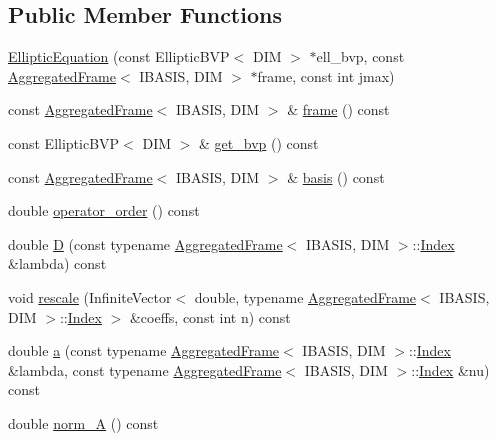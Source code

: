 \subsection*{Public Member Functions}
\begin{CompactItemize}
\item 
\hyperlink{classFrameTL_1_1EllipticEquation_44b302a82e544d16d49cf6b4dab933b0}{EllipticEquation} (const EllipticBVP$<$ DIM $>$ $\ast$ell\_\-bvp, const \hyperlink{classFrameTL_1_1AggregatedFrame}{AggregatedFrame}$<$ IBASIS, DIM $>$ $\ast$frame, const int jmax)
\item 
const \hyperlink{classFrameTL_1_1AggregatedFrame}{AggregatedFrame}$<$ IBASIS, DIM $>$ \& \hyperlink{classFrameTL_1_1EllipticEquation_49f035460f9c0a08ed1a292bf6d3e7f9}{frame} () const 
\item 
const EllipticBVP$<$ DIM $>$ \& \hyperlink{classFrameTL_1_1EllipticEquation_7574a07220674516f1be1fd38b3fb4cc}{get\_\-bvp} () const 
\item 
const \hyperlink{classFrameTL_1_1AggregatedFrame}{AggregatedFrame}$<$ IBASIS, DIM $>$ \& \hyperlink{classFrameTL_1_1EllipticEquation_f3c3552134fe3d41c4d4d00b13130381}{basis} () const 
\item 
double \hyperlink{classFrameTL_1_1EllipticEquation_a5b30bbacf5d024873268eb979e65748}{operator\_\-order} () const 
\item 
double \hyperlink{classFrameTL_1_1EllipticEquation_f7c320c54b0fb68c152af4cad0ef1848}{D} (const typename \hyperlink{classFrameTL_1_1AggregatedFrame}{AggregatedFrame}$<$ IBASIS, DIM $>$::\hyperlink{classFrameTL_1_1FrameIndex}{Index} \&lambda) const 
\item 
void \hyperlink{classFrameTL_1_1EllipticEquation_ce9d2d6b07a48454f4f2ca76908a665a}{rescale} (InfiniteVector$<$ double, typename \hyperlink{classFrameTL_1_1AggregatedFrame}{AggregatedFrame}$<$ IBASIS, DIM $>$::\hyperlink{classFrameTL_1_1FrameIndex}{Index} $>$ \&coeffs, const int n) const 
\item 
double \hyperlink{classFrameTL_1_1EllipticEquation_b0b18bd3a6a0f43c5ed302a2fc80c235}{a} (const typename \hyperlink{classFrameTL_1_1AggregatedFrame}{AggregatedFrame}$<$ IBASIS, DIM $>$::\hyperlink{classFrameTL_1_1FrameIndex}{Index} \&lambda, const typename \hyperlink{classFrameTL_1_1AggregatedFrame}{AggregatedFrame}$<$ IBASIS, DIM $>$::\hyperlink{classFrameTL_1_1FrameIndex}{Index} \&nu) const 
\item 
double \hyperlink{classFrameTL_1_1EllipticEquation_49469f7106fa3e7a70791e2da6146df8}{norm\_\-A} () const 
\item 

\end{CompactItemize}
